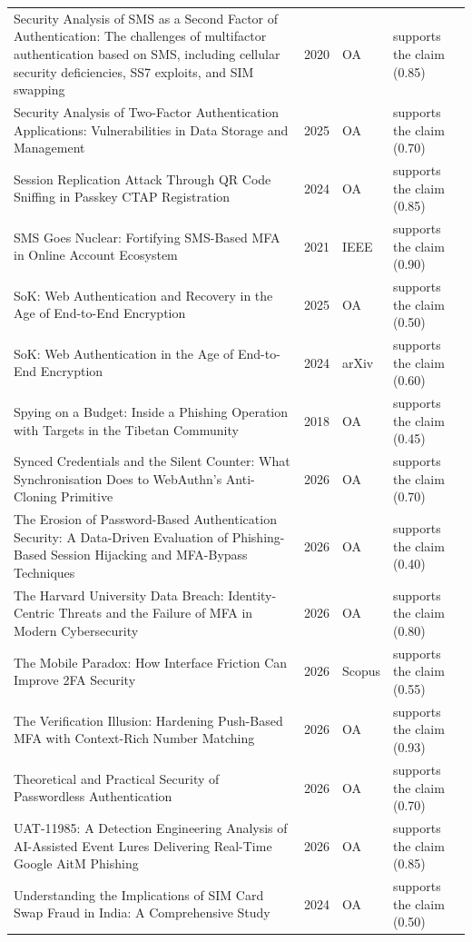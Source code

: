 \begin{longtable}{@{}%
  >{\raggedright\arraybackslash}p{}c%
  >{\raggedright\arraybackslash}p{}%
  >{\raggedright\arraybackslash}p{}@{}}
Security Analysis of SMS as a Second Factor of Authentication: The challenges of multifactor authentication based on SMS, including cellular security deficiencies, SS7 exploits, and SIM swapping & 2020 & OA & supports the claim (0.85) \\
Security Analysis of Two-Factor Authentication Applications: Vulnerabilities in Data Storage and Management & 2025 & OA & supports the claim (0.70) \\
Session Replication Attack Through QR Code Sniffing in Passkey CTAP Registration & 2024 & OA & supports the claim (0.85) \\
SMS Goes Nuclear: Fortifying SMS-Based MFA in Online Account Ecosystem & 2021 & IEEE & supports the claim (0.90) \\
SoK: Web Authentication and Recovery in the Age of End-to-End Encryption & 2025 & OA & supports the claim (0.50) \\
SoK: Web Authentication in the Age of End-to-End Encryption & 2024 & arXiv & supports the claim (0.60) \\
Spying on a Budget: Inside a Phishing Operation with Targets in the Tibetan Community & 2018 & OA & supports the claim (0.45) \\
Synced Credentials and the Silent Counter: What Synchronisation Does to WebAuthn's Anti-Cloning Primitive & 2026 & OA & supports the claim (0.70) \\
The Erosion of Password-Based Authentication Security: A Data-Driven Evaluation of Phishing-Based Session Hijacking and MFA-Bypass Techniques & 2026 & OA & supports the claim (0.40) \\
The Harvard University Data Breach: Identity-Centric Threats and the Failure of MFA in Modern Cybersecurity & 2026 & OA & supports the claim (0.80) \\
The Mobile Paradox: How Interface Friction Can Improve 2FA Security & 2026 & Scopus & supports the claim (0.55) \\
The Verification Illusion: Hardening Push-Based MFA with Context-Rich Number Matching & 2026 & OA & supports the claim (0.93) \\
Theoretical and Practical Security of Passwordless Authentication & 2026 & OA & supports the claim (0.70) \\
UAT-11985: A Detection Engineering Analysis of AI-Assisted Event Lures Delivering Real-Time Google AitM Phishing & 2026 & OA & supports the claim (0.85) \\
Understanding the Implications of SIM Card Swap Fraud in India: A Comprehensive Study & 2024 & OA & supports the claim (0.50) \\

\end{longtable}
